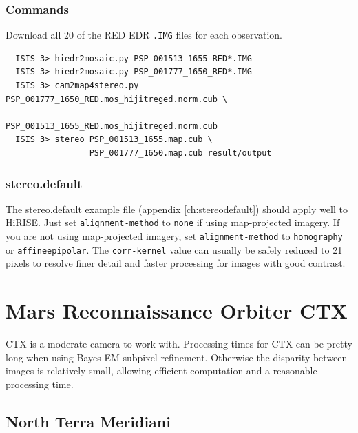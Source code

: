 \subsubsection*{Commands}

Download all 20 of the RED EDR \texttt{.IMG} files for each observation.
\begin{verbatim}
  ISIS 3> hiedr2mosaic.py PSP_001513_1655_RED*.IMG
  ISIS 3> hiedr2mosaic.py PSP_001777_1650_RED*.IMG
  ISIS 3> cam2map4stereo.py PSP_001777_1650_RED.mos_hijitreged.norm.cub \
                            PSP_001513_1655_RED.mos_hijitreged.norm.cub
  ISIS 3> stereo PSP_001513_1655.map.cub \
                 PSP_001777_1650.map.cub result/output
\end{verbatim}

\subsubsection*{stereo.default}

The stereo.default example file (appendix \ref{ch:stereodefault})
should apply well to HiRISE. Just set
\texttt{alignment-method} to \texttt{none} if
using map-projected imagery. If you are not using map-projected
imagery, set \texttt{alignment-method} to \texttt{homography} or
\texttt{affineepipolar}. The \texttt{corr-kernel} value can usually be
safely reduced to 21 pixels to resolve finer detail and faster
processing for images with good contrast.

\vfill

\section{Mars Reconnaissance Orbiter CTX}

\ac{CTX} is a moderate camera to work with. Processing times for
\ac{CTX} can be pretty long when using Bayes EM subpixel
refinement. Otherwise the disparity between images is relatively
small, allowing efficient computation and a reasonable processing time.

\subsection{North Terra Meridiani}


